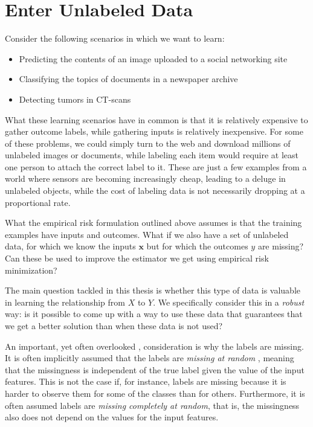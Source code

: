 \documentclass[twoside]{memoir}\usepackage[]{graphicx}\usepackage{xcolor}
\begin{document}
\section{Enter Unlabeled Data}
Consider the following scenarios in which we want to learn:
\begin{itemize}
\item Predicting the contents of an image uploaded to a social networking site
\item Classifying the topics of documents in a newspaper archive
\item Detecting tumors in CT-scans
\end{itemize}
What these learning scenarios have in common is that it is relatively expensive to gather outcome labels, while gathering inputs is relatively inexpensive. For some of these problems, we could simply turn to the web and download millions of unlabeled images or documents, while labeling each item would require at least one person to attach the correct label to it. These are just a few examples from a world where sensors are becoming increasingly cheap, leading to a deluge in unlabeled objects, while the cost of labeling data is not necessarily dropping at a proportional rate.

What the empirical risk formulation outlined above assumes is that the training examples have inputs and outcomes. What if we also have a set of unlabeled data, for which we know the inputs $\mathbf{x}$ but for which the outcomes $y$ are missing? Can these be used to improve the estimator we get using empirical risk minimization?

The main question tackled in this thesis is whether this type of data is valuable in learning the relationship from $X$ to $Y$. We specifically consider this in a \emph{robust} way: is it possible to come up with a way to use these data that guarantees that we get a better solution than when these data is not used?

An important, yet often overlooked \citep{Lafferty2007}, consideration
is why the labels are missing. It is often implicitly assumed that the labels are \emph{missing at random} \citep{Little2002}, meaning that the missingness is independent of the true label given the value of the input features. This is not the case if, for instance, labels are missing because it is harder to observe them for some of the classes than for others. Furthermore, it is often assumed labels are \emph{missing completely at random}, that is, the missingness also does not depend on the values for the input features.
\end{document}
